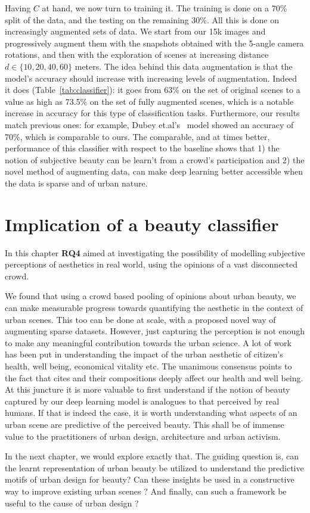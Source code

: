 Having $C$ at hand, we now turn to training it. The training is done on a 70\% split of the data, and the testing on the remaining 30\%. All this is done on increasingly augmented sets of data. We start from our 15k images and progressively augment them with  the snapshots obtained with the 5-angle camera rotations, and then with the exploration of scenes at increasing distance $d \in \{10,20,40,60\}$ meters. The idea behind this data augmentation is that the model's accuracy should increase with increasing levels of augmentation. Indeed it does (Table~\ref{tab:classifier}): it goes from 63\% on the set of original scenes to a value as high as  73.5\% on the set of fully augmented scenes, which is a notable increase in accuracy for this type of classification tasks. Furthermore, our results match previous ones: for example,  Dubey et.al's~\cite{dubey2016deep}  model showed an accuracy of 70\%, which is comparable to ours. 
The comparable, and at times better, performance of this classifier with respect to the baseline shows that 1) the notion of subjective beauty can be learn't from a crowd's participation and 2) the novel method of augmenting data, can make deep learning better accessible when the data is sparse and of urban nature.

\section{Implication of a beauty classifier}
In this chapter \textbf{RQ4} aimed at investigating the possibility of modelling subjective perceptions of aesthetics in real world, using the opinions of a vast disconnected crowd.
 
We found that using a crowd based pooling of opinions about urban beauty, we can make measurable progress towards quantifying the aesthetic in the context of urban scenes. This too can be done at scale, with a proposed novel way of augmenting sparse datasets. However, just capturing the perception is not enough to make any meaningful contribution towards the urban science. 
A lot of work has been put in understanding the impact of the urban aesthetic of citizen's health, well being, economical vitality etc. The unanimous consensus points to the fact that cites and their compositions deeply affect our health and well being. 
At this juncture it is more valuable to first understand if the notion of beauty captured by our deep learning model is analogues to that perceived by real humans. If that is indeed the case, it is worth understanding what aspects of an urban scene are predictive of the perceived beauty. This shall be of immense value to the practitioners of urban design, architecture and urban activism.

In the next chapter, we would explore exactly that. The guiding question is, can the learnt representation of urban beauty be utilized to understand the predictive motifs of urban design for beauty? Can these insights be used in a constructive way to improve existing urban scenes ? And finally, can such a framework be useful to the cause of urban design ? 


